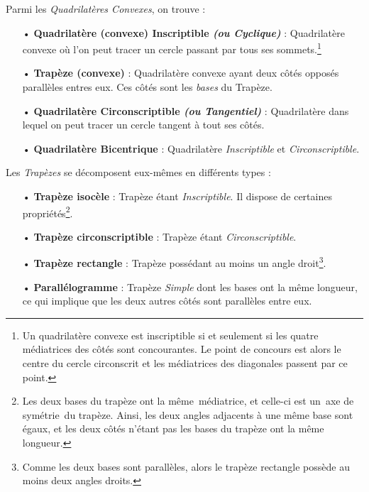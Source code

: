 \documentclass[a4paper, twoside]{article}
\begin{document}
\bigbreak

Parmi les \emph{Quadrilatères Convexes}, on trouve :

\begin{itemize}
	\item[•] \textbf{Quadrilatère (convexe) Inscriptible \textit{(ou Cyclique)}} : Quadrilatère convexe où l'on peut tracer un cercle passant par tous ses sommets.\footnote{
		      Un quadrilatère convexe est inscriptible
		      si et seulement si les quatre médiatrices des côtés
		      sont concourantes. Le point de concours est alors le centre
		      du cercle circonscrit et les médiatrices des diagonales
		      passent par ce point.}

	\item[•] \textbf{Trapèze (convexe)} : Quadrilatère convexe ayant deux côtés opposés parallèles entres eux. Ces côtés sont les \emph{bases} du Trapèze.
	\item[•] \textbf{Quadrilatère Circonscriptible \textit{(ou Tangentiel)}} : Quadrilatère dans lequel on peut tracer un cercle tangent à tout ses côtés.
	\item[•] \textbf{Quadrilatère Bicentrique} : Quadrilatère \textit{Inscriptible} et \textit{Circonscriptible}.
\end{itemize}

\bigbreak

Les \emph{Trapèzes} se décomposent eux-mêmes en différents types :

\begin{itemize}
	\item[•] \textbf{Trapèze isocèle} : Trapèze étant \textit{Inscriptible}. Il dispose de certaines propriétés\footnote{
		      Les deux bases du trapèze ont la même médiatrice, et celle-ci est un axe de symétrie du trapèze.
		      Ainsi, les deux angles adjacents à une même base sont égaux,
		      et les deux côtés n'étant pas les bases du trapèze ont la même longueur.
	      }.

	\item[•] \textbf{Trapèze circonscriptible} : Trapèze étant \textit{Circonscriptible}.
	\item[•] \textbf{Trapèze rectangle} : Trapèze possédant au moins un angle droit\footnote{Comme
		      les deux bases sont parallèles,
		      alors le trapèze rectangle possède au moins deux angles droits.}.
	\item[•] \textbf{Parallélogramme} : Trapèze \textit{Simple} dont les bases ont la même longueur,
	      ce qui implique que les deux autres côtés sont parallèles entre eux.
\end{itemize}
\end{document}
